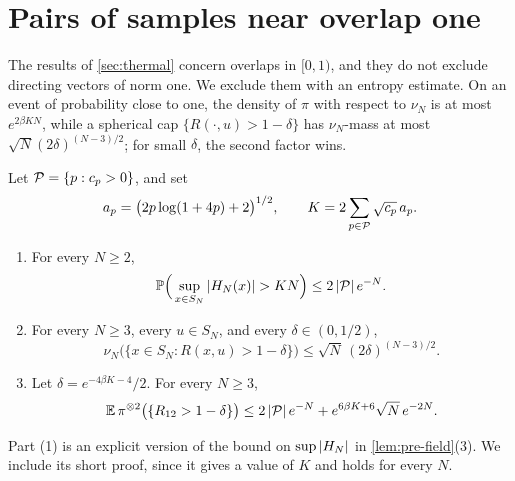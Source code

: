 \section{Pairs of samples near overlap one}\label{sec:dir-cap}

The results of \cref{sec:thermal} concern overlaps in $[0,1)$, and they do not exclude directing vectors of norm one. We exclude them with an entropy estimate. On an event of probability close to one, the density of $\pi$ with respect to $\nu_N$ is at most $e^{2\beta KN}$, while a spherical cap $\{R(\cdot,u)>1-\delta\}$ has $\nu_N$-mass at most $\sqrt N(2\delta)^{(N-3)/2}$; for small $\delta$, the second factor wins.

\begin{lemma}\label{lem:dir-cap}
Let $\mathcal P=\{p:c_p>0\}$, and set
\[
a_p=\big(2p\log(1+4p)+2\big)^{1/2},\qquad K=2\sum_{p\in\mathcal P}\sqrt{c_p}\,a_p.
\]
\begin{enumerate}
\item For every $N\ge2$,
\begin{equation}\label{eq:dir-field}
\Pp\Big(\sup_{x\in S_N}\abs{H_N(x)}>KN\Big)\le2\abs{\cP}e^{-N}.
\end{equation}
\item For every $N\ge3$, every $u\in S_N$, and every $\delta\in(0,1/2)$,
\begin{equation}\label{eq:dir-cap}
\nu_N\big(\{x\in S_N:R(x,u)>1-\delta\}\big)\le\sqrt N\,(2\delta)^{(N-3)/2}.
\end{equation}
\item Let $\delta=e^{-4\beta K-4}/2$. For every $N\ge3$,
\begin{equation}\label{eq:dir-pair}
\mathbb E\,\pi^{\otimes2}\big(\{R_{12}>1-\delta\}\big)\le2\left|\mathcal P\right|e^{-N}+e^{6\beta K+6}\sqrt N\,e^{-2N}.
\end{equation}
\end{enumerate}
\end{lemma}

Part (1) is an explicit version of the bound on $\sup\left|H_N\right|$ in \cref{lem:pre-field}(3). We include its short proof, since it gives a value of $K$ and holds for every $N$.

